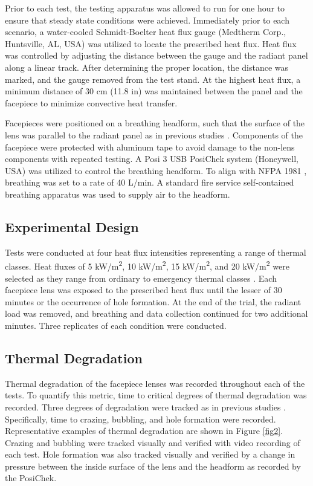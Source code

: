 \documentclass[sn-mathphys]{sn-jnl}%
\theoremstyle{thmstyleone}%
\theoremstyle{thmstyletwo}%
\theoremstyle{thmstylethree}%
\begin{document}
Prior to each test, the testing apparatus was allowed to run for one hour to ensure that steady state conditions were achieved. Immediately prior to each scenario, a water-cooled Schmidt-Boelter heat flux gauge (Medtherm Corp., Huntsville, AL, USA) was utilized to locate the prescribed heat flux. Heat flux was controlled by adjusting the distance between the gauge and the radiant panel along a linear track. After determining the proper location, the distance was marked, and the gauge removed from the test stand. At the highest heat flux, a minimum distance of 30 cm (11.8 in) was maintained between the panel and the facepiece to minimize convective heat transfer. 

Facepieces were positioned on a breathing headform, such that the surface of the lens was parallel to the radiant panel as in previous studies \cite{putorti_thermal_2013,horn_study_2017,kesler_mechanical_2018}. Components of the facepiece were protected with aluminum tape to avoid damage to the non-lens components with repeated testing. A Posi 3 USB PosiChek system (Honeywell, USA) was utilized to control the breathing headform. To align with NFPA 1981 \cite{national_fire_protection_association_nfpa_2013}, breathing was set to a rate of 40 L/min. A standard fire service self-contained breathing apparatus was used to supply air to the headform. 

\subsection{Experimental Design}\label{subsec4}
Tests were conducted at four heat flux intensities representing a range of thermal classes. Heat fluxes of 5 kW/m\textsuperscript{2}, 10 kW/m\textsuperscript{2}, 15 kW/m\textsuperscript{2}, and 20 kW/m\textsuperscript{2} were selected as they range from ordinary to emergency thermal classes \cite{utech_status_1973}. Each facepiece lens was exposed to the prescribed heat flux until the lesser of 30 minutes or the occurrence of hole formation. At the end of the trial, the radiant load was removed, and breathing and data collection continued for two additional minutes. Three replicates of each condition were conducted. 

\subsection{Thermal Degradation}\label{subsec5}
Thermal degradation of the facepiece lenses was recorded throughout each of the tests. To quantify this metric, time to critical degrees of thermal degradation was recorded. Three degrees of degradation were tracked as in previous studies \cite{mensch_fire_2011}. Specifically, time to crazing, bubbling, and hole formation were recorded. Representative examples of thermal degradation are shown in Figure \ref{fig2}. Crazing and bubbling were tracked visually and verified with video recording of each test. Hole formation was also tracked visually and verified by a change in pressure between the inside surface of the lens and the headform as recorded by the PosiChek. 
\end{document}
